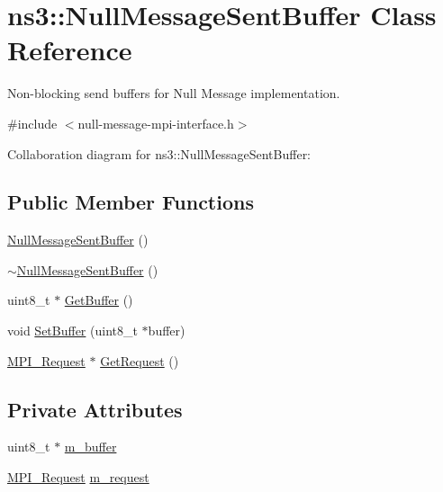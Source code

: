 \hypertarget{classns3_1_1NullMessageSentBuffer}{}\section{ns3\+:\+:Null\+Message\+Sent\+Buffer Class Reference}
\label{classns3_1_1NullMessageSentBuffer}


Non-\/blocking send buffers for Null Message implementation.  




{\ttfamily \#include $<$null-\/message-\/mpi-\/interface.\+h$>$}



Collaboration diagram for ns3\+:\+:Null\+Message\+Sent\+Buffer\+:
\subsection*{Public Member Functions}
\begin{DoxyCompactItemize}
\item 
\hyperlink{classns3_1_1NullMessageSentBuffer_a53f850135ad00a51933994fe26611022}{Null\+Message\+Sent\+Buffer} ()
\item 
\hyperlink{classns3_1_1NullMessageSentBuffer_a21d9f3fecb768ae20c8290bf1f3594af}{$\sim$\+Null\+Message\+Sent\+Buffer} ()
\item 
uint8\+\_\+t $\ast$ \hyperlink{classns3_1_1NullMessageSentBuffer_aeb061f1da5023b1577c542e264623a5b}{Get\+Buffer} ()
\item 
void \hyperlink{classns3_1_1NullMessageSentBuffer_aeb8312d6d682f2cedaeae4249207d731}{Set\+Buffer} (uint8\+\_\+t $\ast$buffer)
\item 
\hyperlink{granted-time-window-mpi-interface_8h_a31b372fd1cca939295900acb2a4961dd}{M\+P\+I\+\_\+\+Request} $\ast$ \hyperlink{classns3_1_1NullMessageSentBuffer_abc6912f619c4c5e18fdd4b011a41e41e}{Get\+Request} ()
\end{DoxyCompactItemize}
\subsection*{Private Attributes}
\begin{DoxyCompactItemize}
\item 
uint8\+\_\+t $\ast$ \hyperlink{classns3_1_1NullMessageSentBuffer_afe9610da576484e202ddea7d621840c7}{m\+\_\+buffer}
\item 
\hyperlink{granted-time-window-mpi-interface_8h_a31b372fd1cca939295900acb2a4961dd}{M\+P\+I\+\_\+\+Request} \hyperlink{classns3_1_1NullMessageSentBuffer_a1b4004581de309f11191e7085aa529a5}{m\+\_\+request}
\end{DoxyCompactItemize}


